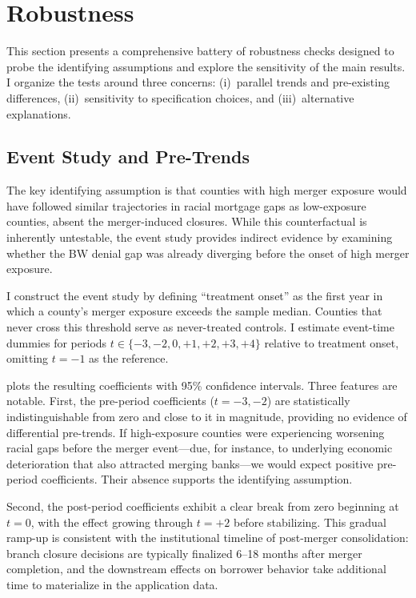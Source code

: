 \documentclass[12pt]{article}
\begin{document}
\section{Robustness}
\label{sec:robustness}

This section presents a comprehensive battery of robustness checks designed to probe the identifying assumptions and explore the sensitivity of the main results. I organize the tests around three concerns: (i)~parallel trends and pre-existing differences, (ii)~sensitivity to specification choices, and (iii)~alternative explanations.

\subsection{Event Study and Pre-Trends}

The key identifying assumption is that counties with high merger exposure would have followed similar trajectories in racial mortgage gaps as low-exposure counties, absent the merger-induced closures. While this counterfactual is inherently untestable, the event study provides indirect evidence by examining whether the BW denial gap was already diverging before the onset of high merger exposure.

I construct the event study by defining ``treatment onset'' as the first year in which a county's merger exposure exceeds the sample median. Counties that never cross this threshold serve as never-treated controls. I estimate event-time dummies for periods $t \in \{-3, -2, 0, +1, +2, +3, +4\}$ relative to treatment onset, omitting $t = -1$ as the reference.

 plots the resulting coefficients with 95\% confidence intervals. Three features are notable. First, the pre-period coefficients ($t = -3, -2$) are statistically indistinguishable from zero and close to it in magnitude, providing no evidence of differential pre-trends. If high-exposure counties were experiencing worsening racial gaps before the merger event---due, for instance, to underlying economic deterioration that also attracted merging banks---we would expect positive pre-period coefficients. Their absence supports the identifying assumption.

Second, the post-period coefficients exhibit a clear break from zero beginning at $t = 0$, with the effect growing through $t = +2$ before stabilizing. This gradual ramp-up is consistent with the institutional timeline of post-merger consolidation: branch closure decisions are typically finalized 6--18 months after merger completion, and the downstream effects on borrower behavior take additional time to materialize in the application data.
\end{document}
